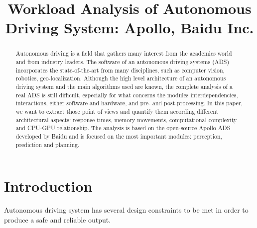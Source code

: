 \documentclass[conference]{IEEEtran}
\begin{document}
\title{Workload Analysis of Autonomous Driving System: Apollo, Baidu Inc.}

\author{
\and
{}
\and
{}
}
\maketitle

\begin{abstract}
    Autonomous driving is a field that gathers many interest from the academics world and from industry leaders.
    The software of an autonomous driving systems (ADS) incorporates the state-of-the-art from many disciplines, such as computer vision, robotics, geo-localization.
    Although the high level architecture of an autonomous driving system and the main algorithms used are known, the complete analysis of a real ADS is still difficult, especially for what concerns the modules interdependencies, interactions, either software and hardware, and pre- and post-processing.
    In this paper, we want to extract those point of views and quantify them according different architectural aspects: response times, memory movements, computational complexity and CPU-GPU relationship.
    The analysis is based on the open-source Apollo ADS developed by Baidu and is focused on the most important modules: perception, prediction and planning.
\end{abstract}

\section{Introduction}
Autonomous driving system has several design constraints \cite{b1} to be met in order to produce a safe and reliable output.
\end{document}
